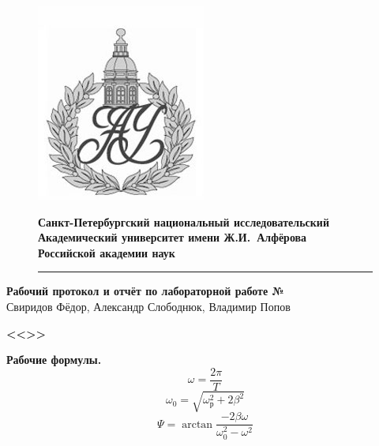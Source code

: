 \documentclass[a4paper]{article}
\begin{document}
	\begin{figure}[htb]
		\begin{minipage}[c]{0.12\textwidth}
			\includegraphics[scale=0.25]{AU}
		\end{minipage}
		\hfill
		\begin{minipage}[t]{0.9\textwidth}
			{\Large\bfseries Санкт-Петербургский национальный исследовательский Академический университет имени Ж.И.~Алфёрова\\Российской академии наук}
		\end{minipage}
		\rule{164mm}{0.3mm}
	\end{figure}
	
	\begin{center}
		{\large\textbf{Рабочий протокол и отчёт по лабораторной работе № }}\\
		Свиридов Фёдор, Александр Слободнюк, Владимир Попов
	\end{center}
	\begin{center}
		\Large\bfseries{<<>>}\\
	\end{center}
	
	{\parindent=0pt\textbf{Рабочие формулы.}}\\
	
	\begin{equation}
		\omega = \frac{2\pi}{T}
	\end{equation}
		\begin{equation}
		 \omega_0 = \sqrt{\omega_\text{р}^2 + 2\beta^2}
	\end{equation}
			\begin{equation}
		 \Psi = \arctan{\frac{-2\beta\omega}{\omega_0^2 - \omega^2}}
	\end{equation}
\end{document}
